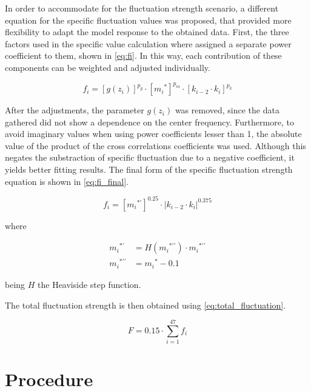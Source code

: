 \documentclass[../main.tex]{subfiles}
\begin{document}
\begin{modelchapter}
In order to accommodate for the fluctuation strength scenario, a different
equation for the specific fluctuation values was proposed, that provided more
flexibility to adapt the model response to the obtained data. First, the three
factors used in the specific value calculation where assigned a separate power
coefficient to them, shown in \cref{eq:fi}. In this way, each contribution of
these components can be weighted and adjusted individually.

\begin{equation}
  f_i = [g(z_i)]^{p_g} \cdot [{m_i}^*]^{p_m} \cdot [k_{i-2} \cdot k_i]^{p_k}
  \label{eq:fi}
\end{equation}

After the adjustments, the parameter $g(z_i)$ was removed, since the data
gathered did not show a dependence on the center frequency. Furthermore, to
avoid imaginary values when using power coefficients lesser than 1, the absolute
value of the product of the cross correlations coefficients was used. Although
this negates the substraction of specific fluctuation due to a negative
coefficient, it yields better fitting results. The final form of the specific
fluctuation strength equation is shown in \cref{eq:fi_final}.

\begin{equation}
  f_i = [{m_i}^{*\prime}]^{0.25} \cdot |k_{i-2} \cdot k_i|^{0.375}
  \label{eq:fi_final}
\end{equation}

where

\begin{align}
  {m_i}^{*\prime} &= H({m_i}^{*\prime\prime}) \cdot {m_i}^{*\prime\prime}
  \label{eq:md_transformation_1} \\
  {m_i}^{*\prime\prime} &= {m_i}^* - 0.1
  \label{eq:md_transformation_2}
\end{align}

being $H$ the Heaviside step function.

The total fluctuation strength is then obtained using
\cref{eq:total_fluctuation}.

\begin{equation}
  F = 0.15 \cdot \displaystyle\sum_{i=1}^{47} f_i
  \label{eq:total_fluctuation}
\end{equation}

\section{Procedure}


\end{modelchapter}
\end{document}
